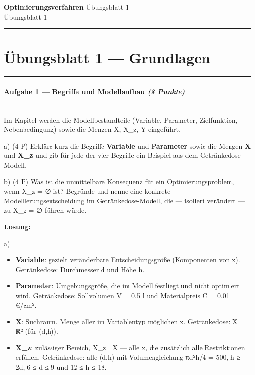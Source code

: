 \documentclass[11pt, a4paper]{article}
\providecommand{\nichttitle}{Übungsblatt}
\providecommand{\nichtsubtitle}{}
\renewcommand{\nichttitle}{Optimierungsverfahren}
\renewcommand{\nichtsubtitle}{Übungsblatt 1}
\begin{document}
\begin{center}
{\Large\bfseries\color{accent}\nichttitle}
\ifx\nichtsubtitle\empty\else
  \\[2pt]{\normalsize\color{accent!80!black}\nichtsubtitle}
\fi
\\[2pt]
\color{accent}\rule{0.4\linewidth}{0.8pt}\color{black}
\end{center}
\vspace{4pt}


\section{Übungsblatt 1 — Grundlagen}


\noindent\textcolor{rulegray}{\rule{\linewidth}{0.4pt}}


\paragraph{Aufgabe 1 — Begriffe und Modellaufbau \textit{(8 Punkte)}}\mbox{}\\[2pt]

Im Kapitel werden die Modellbestandteile (Variable, Parameter, Zielfunktion, Nebenbedingung) sowie die Mengen X, X\_z, Y eingeführt.


a) (4 P) Erkläre kurz die Begriffe \textbf{Variable} und \textbf{Parameter} sowie die Mengen \textbf{X} und \textbf{X\_z} und gib für jede der vier Begriffe ein Beispiel aus dem Getränkedose-Modell.


b) (4 P) Was ist die unmittelbare Konsequenz für ein Optimierungsproblem, wenn X\_z = ∅ ist? Begründe und nenne eine konkrete Modellierungsentscheidung im Getränkedose-Modell, die — isoliert verändert — zu X\_z = ∅ führen würde.


\textbf{Lösung:}


a)

\begin{itemize}
  \item \textbf{Variable}: gezielt veränderbare Entscheidungsgröße (Komponenten von x⃗). Getränkedose: Durchmesser d und Höhe h.
  \item \textbf{Parameter}: Umgebungsgröße, die im Modell festliegt und nicht optimiert wird. Getränkedose: Sollvolumen V = 0.5 l und Materialpreis C = 0.01 €/cm².
  \item \textbf{X}: Suchraum, Menge aller im Variablentyp möglichen x⃗. Getränkedose: X = ℝ² (für (d,h)).
  \item \textbf{X\_z}: zulässiger Bereich, X\_z ⊆ X — alle x⃗, die zusätzlich alle Restriktionen erfüllen. Getränkedose: alle (d,h) mit Volumengleichung πd²h/4 = 500, h ≥ 2d, 6 ≤ d ≤ 9 und 12 ≤ h ≤ 18.
\end{itemize}
\end{document}
